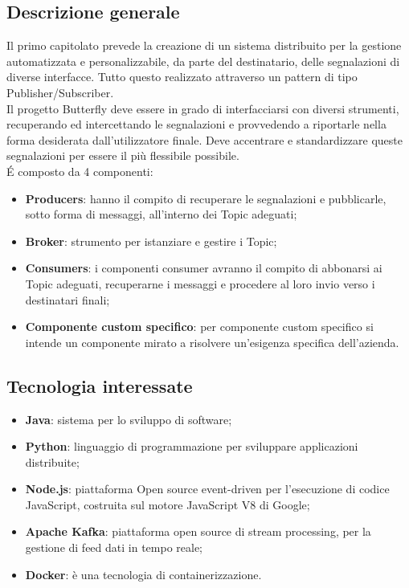 \documentclass[11pt,a4paper]{article}
\begin{document}
	\subsection{Descrizione generale}
	Il primo capitolato prevede la creazione di un sistema distribuito per la gestione automatizzata e personalizzabile, da parte del destinatario, delle segnalazioni di diverse interfacce. Tutto questo realizzato attraverso un pattern di tipo Publisher/Subscriber. \\
	Il progetto Butterfly deve essere in grado di interfacciarsi con diversi strumenti, recuperando ed intercettando le segnalazioni e provvedendo a riportarle nella forma desiderata dall'utilizzatore finale. Deve accentrare e standardizzare queste segnalazioni per essere il più flessibile possibile.\\
	\'E composto da 4 componenti:
	\begin{itemize}
		\item \textbf{Producers}: hanno il compito di recuperare le segnalazioni e pubblicarle, sotto forma di messaggi, all'interno dei Topic adeguati;
		\item \textbf{Broker}: strumento per istanziare e gestire i Topic;
		\item \textbf{Consumers}: i componenti consumer avranno il compito di abbonarsi ai Topic adeguati, recuperarne i	messaggi e procedere al loro invio verso i destinatari finali;
		\item \textbf{Componente custom specifico}: per componente custom specifico si intende un componente mirato a risolvere un'esigenza specifica dell'azienda. 
	\end{itemize}
	\subsection{Tecnologia interessate}
	\begin{itemize}
		\item \textbf{Java}: sistema per lo sviluppo di software;
		\item \textbf{Python}: linguaggio di programmazione per sviluppare applicazioni distribuite;
		\item \textbf{Node.js}: piattaforma Open source event-driven per l'esecuzione di codice JavaScript, costruita sul motore JavaScript V8 di Google;
		\item \textbf{Apache Kafka}: piattaforma open source di stream processing, per la gestione di feed dati in tempo reale;		
		\item \textbf{Docker}: è una tecnologia di containerizzazione.
	\end{itemize}
\end{document}
